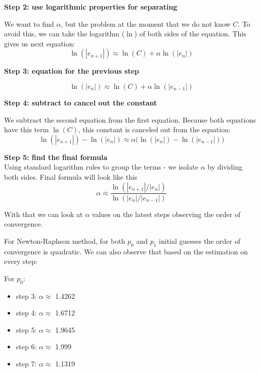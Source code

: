 \documentclass{article}
\begin{document}
\vspace{5pt}
\noindent \textbf{Step 2: use logarithmic properties for separating}

We want to find $\alpha$, but the problem at the moment that we do not know $C$. To avoid this, we can take the logarithm ($\ln$) of both sides of the equation. This gives us next equation:
\begin{equation*}
    \ln(|e_{n+1}|) \approx \ln(C) + \alpha \ln(|e_n|)
\end{equation*}

\vspace{5pt}
\noindent \textbf{Step 3: equation for the previous step}

\begin{equation*}
    \ln(|e_n|) \approx \ln(C) + \alpha \ln(|e_{n-1}|)
\end{equation*}

\vspace{5pt}
\noindent \textbf{Step 4: subtract to cancel out the constant}

We subtract the second equation from the first equation. Because both equations have this term $\ln(C)$, this constant is canceled out from the equation:
\begin{equation*}
    \ln(|e_{n+1}|) - \ln(|e_n|) \approx \alpha \big( \ln(|e_n|) - \ln(|e_{n-1}|) \big)
\end{equation*}

\vspace{5pt}
\noindent \textbf{Step 5: find the final formula} \\
Using standard logarithm rules to group the terms - we isolate $\alpha$ by dividing both sides. Final formula will look like this
\begin{equation}
    \alpha \approx \frac{\ln(|e_{n+1}|/|e_n|)}{\ln(|e_n|/|e_{n-1}|)}
\end{equation}

With that we can look at $\alpha$ values on the latest steps observing the order of convergence.

For Newton-Raphson method, for both $p_0$ and $p_1$ initial guesses the order of convergence is quadratic. We can also observe that based on the estimation on every step:

For $p_0$:
\begin{itemize}
    \item step 3: $\alpha \approx$ 1.4262
    \item step 4: $\alpha \approx$ 1.6712
    \item step 5: $\alpha \approx$ 1.9645
    \item step 6: $\alpha \approx$ 1.999
    \item step 7: $\alpha \approx$ 1.1319
\end{itemize}
\end{document}
